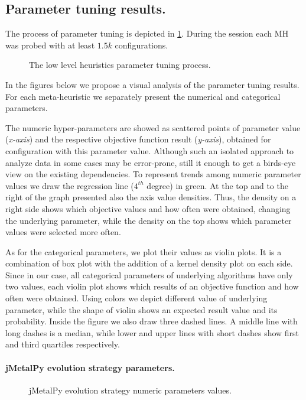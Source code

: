 \subsection{Parameter tuning results.} 
The process of parameter tuning is depicted in \cref{eval:pict:mh tuning}. During the session each MH was probed with at least $1.5k$ configurations. 


\begin{figure}[h!]
	\centering
	
	\caption{The low level heuristics parameter tuning process.}
	\label{eval:pict:mh tuning}
\end{figure}

In the figures below we propose a visual analysis of the parameter tuning results. For each meta-heuristic we separately present the numerical and categorical parameters.

The numeric hyper-parameters are showed as scattered points of parameter value (\emph{x-axis}) and the respective objective function result (\emph{y-axis}), obtained for configuration with this parameter value. Although such an isolated approach to analyze data in some cases may be error-prone, still it enough to get a birds-eye view on the existing dependencies. To represent trends among numeric parameter values we draw the regression line ($4^{th}$ degree) in green. At the top and to the right of the graph presented also the axis value densities. Thus, the density on a right side shows which objective values and how often were obtained, changing the underlying parameter, while the density on the top shows which parameter values were selected more often.

As for the categorical parameters, we plot their values as violin plots. It is a combination of box plot with the addition of a kernel density plot on each side. Since in our case, all categorical parameters of underlying algorithms have only two values, each violin plot shows which results of an objective function and how often were obtained. Using colors we depict different value of underlying parameter, while the shape of violin shows an expected result value and its probability. Inside the figure we also draw three dashed lines. A middle line with long dashes is a median, while lower and upper lines with short dashes show first and third quartiles respectively.


\paragraph{jMetalPy evolution strategy parameters.}
\begin{figure}[h!]
	\centering
	\vspace{-20pt}
	
	\caption{jMetalPy evolution strategy numeric parameters values.}
	\label{eval:pict:jmetalpy es numeric}
	\vspace{-15pt}
\end{figure}

